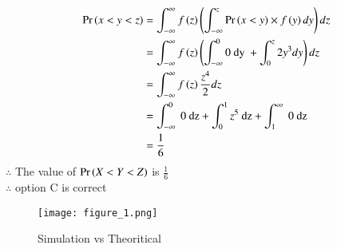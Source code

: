 \documentclass[journal,12pt,twocolumn]{IEEEtran}
\begin{document}
\begin{align}
\Pr\left(x<y<z\right)&=\int_{-\infty}^{\infty} f\left(z\right)\left(\int _{-\infty}^z \Pr\left(x<y\right)\times f\left(y\right)dy\right)dz\\
&=\int_{-\infty}^{\infty}f\left(z\right)\left(\int_{-\infty}^0 \text{0 dy }+ \int _0^z 2y^3dy\right)dz\nonumber\\
&=\int_{-\infty}^{\infty}f\left(z\right)\frac{z^4}{2}dz\nonumber\\
&=\int_{-\infty}^{0}\text{ 0 dz}+\int_{0}^{1}z^5\text{ dz} +\int_{1}^{\infty}\text{ 0 dz}\nonumber\\
&=\frac{1}{6}
\end{align}
$\therefore$ The value of $\Pr\left(X<Y<Z\right)$ is $\frac{1}{6}$ \\
$\therefore$ option C is correct
\begin{figure}[h!]
    \centering
    \texttt{[image: figure\_1.png]}
    \caption{Simulation vs Theoritical}
    \label{fig:my_label}
\end{figure}
\end{document}
